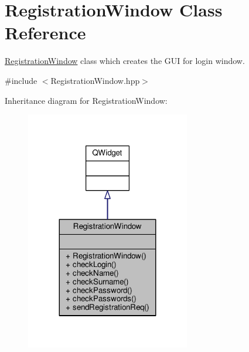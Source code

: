 \hypertarget{classRegistrationWindow}{}\section{Registration\+Window Class Reference}
\label{classRegistrationWindow}


\hyperlink{classRegistrationWindow}{Registration\+Window} class which creates the G\+UI for login window.  




{\ttfamily \#include $<$Registration\+Window.\+hpp$>$}



Inheritance diagram for Registration\+Window\+:
\nopagebreak
\begin{figure}[H]
\begin{center}
\leavevmode
\includegraphics[width=203pt]{classRegistrationWindow__inherit__graph}
\end{center}
\end{figure}


